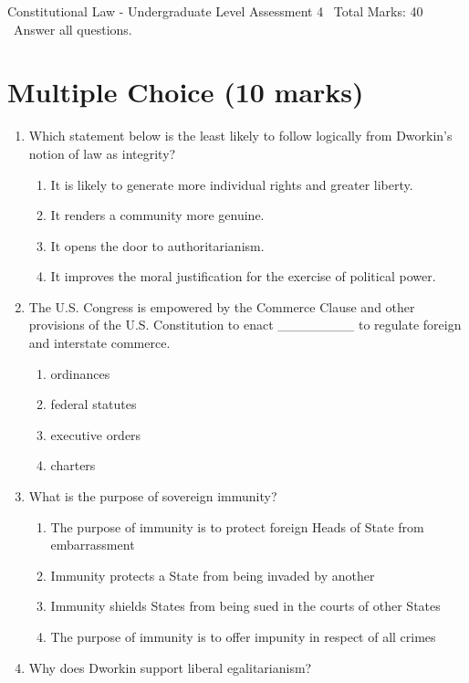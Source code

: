 \documentclass[12pt]{article}
\begin{document}
\begin{center}
Constitutional Law - Undergraduate Level Assessment 4 \
Total Marks: 40 \
Answer all questions.
\end{center}

\section*{Multiple Choice (10 marks)}
\begin{enumerate}[label=\arabic*.]
\item Which statement below is the least likely to follow logically from Dworkin's notion of law as integrity?
\begin{enumerate}[label=(\alph*)]
    \item It is likely to generate more individual rights and greater liberty.
    \item It renders a community more genuine.
    \item It opens the door to authoritarianism.
    \item It improves the moral justification for the exercise of political power.
\end{enumerate}
\item The U.S. Congress is empowered by the Commerce Clause and other provisions of the U.S. Constitution to enact \_\_\_\_\_\_\_\_ to regulate foreign and interstate commerce.
\begin{enumerate}[label=(\alph*)]
    \item ordinances
    \item federal statutes
    \item executive orders
    \item charters
\end{enumerate}
\item What is the purpose of sovereign immunity?
\begin{enumerate}[label=(\alph*)]
    \item The purpose of immunity is to protect foreign Heads of State from embarrassment
    \item Immunity protects a State from being invaded by another
    \item Immunity shields States from being sued in the courts of other States
    \item The purpose of immunity is to offer impunity in respect of all crimes
\end{enumerate}
\item Why does Dworkin support liberal egalitarianism?

\end{enumerate}
\end{document}
